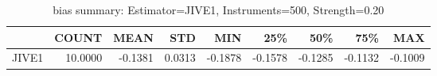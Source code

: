 \begin{table}[ht]
\centering
\caption{bias summary: Estimator=JIVE1, Instruments=500, Strength=0.20}
\begin{tabular}{lrrrrrrrr}
\toprule
 & COUNT & MEAN & STD & MIN & 25\% & 50\% & 75\% & MAX \\
\midrule
JIVE1 & 10.0000 & -0.1381 & 0.0313 & -0.1878 & -0.1578 & -0.1285 & -0.1132 & -0.1009 \\
\bottomrule
\end{tabular}
\end{table}
